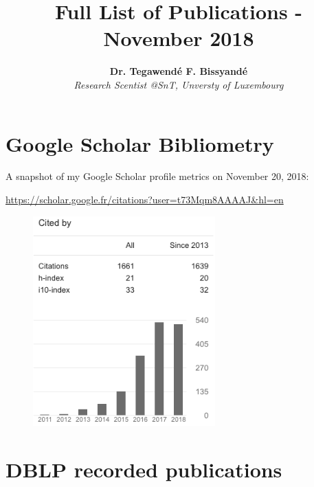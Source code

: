 \documentclass[10pt]{article}
\author{\textbf{Dr. Tegawend\'e F. Bissyand\'e} \\ 
{\em Research Scentist @SnT, Unversty of Luxembourg}}
\title{{Full List of Publications - November 2018}}
\date{}
\begin{document}
\maketitle


\section*{Google Scholar Bibliometry}

A snapshot of my Google Scholar profile metrics on November 20, 2018:
\begin{center}
	\url{https://scholar.google.fr/citations?user=t73Mqm8AAAAJ&hl=en}
\end{center}

\begin{figure}[!h]
\centering
	\includegraphics[width=7cm]{screenshot_Nov2018.png}
\end{figure}
\section*{DBLP recorded publications}


\nocite{*} 

\medskip

\printbibliography[sorting=ydnt,heading=subbibintoc,title={Thesis, Book chapter, Proceedings edition}]

\end{document}
